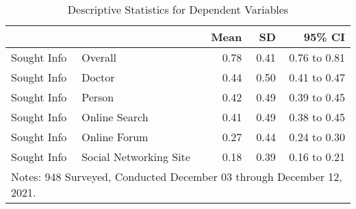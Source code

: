 \begin{table}[!ht]

\caption{\label{tab:table-1-ind}Descriptive Statistics for Dependent Variables}
\centering
\begin{tabular}{llrrr}
\toprule
  &    & Mean & SD & 95\% CI\\ \midrule
Sought Info & Overall  &  \num{0.78} & \num{0.41} & \num{0.76} to \num{0.81}\\
Sought Info & Doctor & \num{0.44} & \num{0.50} & \num{0.41} to \num{0.47}\\
Sought Info & Person & \num{0.42} & \num{0.49} & \num{0.39} to \num{0.45}\\
Sought Info & Online Search & \num{0.41} & \num{0.49} & \num{0.38} to \num{0.45}\\
Sought Info & Online Forum & \num{0.27} & \num{0.44} & \num{0.24} to \num{0.30}\\
Sought Info & Social Networking Site & \num{0.18} & \num{0.39} & \num{0.16} to \num{0.21}\\
\bottomrule
\multicolumn{5}{l}{\rule{0pt}{1em}Notes: 948 Surveyed, Conducted December 03 through December 12, 2021.}\\
\end{tabular}
\end{table}